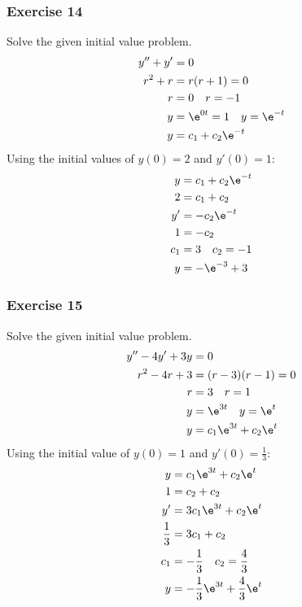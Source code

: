 \documentclass{math}
\begin{document}
\subsubsection*{Exercise 14}
Solve the given initial value problem.
\begin{align*}
  y''+y' &= 0 \\
  r^2+r &= r(r+1) = 0 \\
  r &= 0 \quad r = -1 \\
  y &= \e^{0t} = 1 \quad y = \e^{-t} \\
  y &= c_1+c_2\e^{-t}
\end{align*}
Using the initial values of \( y(0) = 2 \) and \( y'(0) = 1 \):
\begin{align*}
  y &= c_1+c_2\e^{-t} \\
  2 &= c_1+c_2 \\
  y' &= -c_2\e^{-t} \\
  1 &= -c_2 \\
  c_1 &= 3 \quad c_2 = -1 \\
  y &= -\e^{-3}+3
\end{align*}

\subsubsection*{Exercise 15}
Solve the given initial value problem.
\begin{align*}
  y''-4y'+3y &= 0 \\
  r^2-4r+3 &= (r-3)(r-1) = 0 \\
  r &= 3 \quad r = 1 \\
  y &= \e^{3t} \quad y = \e^t \\
  y &= c_1\e^{3t}+c_2\e^t
\end{align*}
Using the initial value of \( y(0) = 1 \) and \( y'(0) = \frac{1}{3} \):
\begin{align*}
  y &= c_1\e^{3t}+c_2\e^t \\
  1 &= c_2+c_2 \\
  y' &= 3c_1\e^{3t}+c_2\e^t \\
  \frac{1}{3} &= 3c_1+c_2 \\
  c_1 &= -\frac{1}{3} \quad c_2 = \frac{4}{3} \\
  y &= -\frac{1}{3}\e^{3t}+\frac{4}{3}\e^t
\end{align*}
\end{document}
